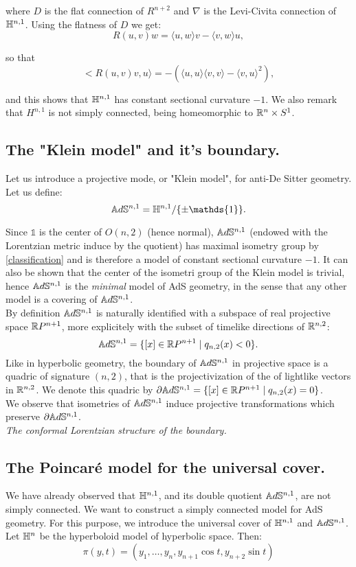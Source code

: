 where $D$ is the flat connection of $R^{n+2}$ and $\nabla$ is the Levi-Civita connection of $\mathbb{H}^{n,1}$. Using the flatness of $D$ we get: 
\[
    R(u,v)w=\langle u,w\rangle v-\langle v,w\rangle u,
\]

so that 
\[
    <R(u,v)v,u\rangle =-(\langle u,u\rangle\langle v,v\rangle-\langle v,u\rangle^2), 
\]

and this shows that $\mathbb{H}^{n,1}$ has constant sectional curvature $-1$. We also remark that $H^{n,1}$ is not simply connected, being homeomorphic to $\mathbb{R}^{n}\times S^1$. 

\subsection{The "Klein model" and it's boundary.}
Let us introduce a projective mode, or "Klein model", for anti-De Sitter geometry. Let us define: 
\[
    \A^{n,1}=\H^{n,1}/\{\pm \mathds{1}\}.
\]

Since $\mathds{1}$ is the center of $O(n,2)$ (hence normal), $\mathbb{A}d\mathbb{S}^{n,1}$ (endowed with the Lorentzian metric induce by the quotient) has maximal isometry group by \ref{classification} and is therefore a model of constant sectional curvature $-1$. It can also be shown that the center of the isometri group of the Klein model is trivial, hence $\mathbb{A}d\mathbb{S}^{n,1}$ is the \textit{minimal} model of AdS geometry, in the sense that any other model is a covering of $\mathbb{A}d\mathbb{S}^{n,1}$.\\
By definition $\mathbb{A}d\mathbb{S}^{n,1}$ is naturally identified with a subspace of real projective space $\mathbb{R} P^{n+1}$, more explicitely with the subset of timelike directions of $\mathbb{R}^{n,2}$: 
\[
    \mathbb{A}d\mathbb{S}^{n,1}=\{[x]\in \mathbb{R} P^{n+1}\;|\;q_{n,2}(x)<0\}.
\]
Like in hyperbolic geometry, the boundary of $\mathbb{A}d\mathbb{S}^{n,1}$ in projective space is a quadric of signature $(n,2)$, that is the projectivization of the of lightlike vectors in $\mathbb{R}^{n,2}$. We denote this quadric by $\partial \mathbb{A}d\mathbb{S}^{n,1}=\{[x]\in \mathbb{R} P^{n+1}\;|\;q_{n,2}(x)=0\}$.\\ We observe that isometries of $\mathbb{A}d\mathbb{S}^{n,1}$ induce projective transformations which preserve $\partial \mathbb{A}d\mathbb{S}^{n,1}$.  \\

\textit{The conformal Lorentzian structure of the boundary.}

\subsection{The Poincaré model for the universal cover.}
We have already observed that $\mathbb{H}^{n,1}$, and its double quotient $\mathbb{A}d\mathbb{S}^{n,1}$, are not simply connected. We want to construct a simply connected model for AdS geometry. For this purpose, we introduce the universal cover of $\mathbb{H}^{n,1}$ and $\mathbb{A}d\mathbb{S}^{n,1}$.\\
Let $\mathbb{H}^n$ be the hyperboloid model of hyperbolic space. Then: 
\[
    \pi(y,t)=(y_1,\dots,y_n,y_{n+1}\cos t,y_{n+2}\sin t)
\]

